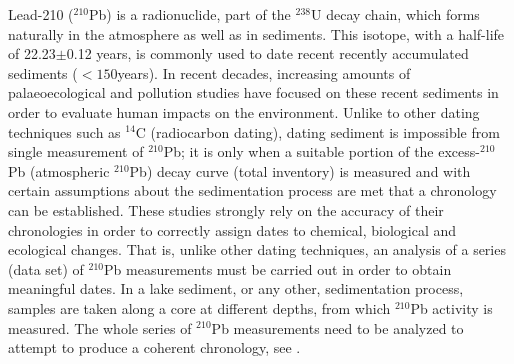 \documentclass [10pt] {article}
\begin{document}
Lead-210 ($^{210}$Pb) is a radionuclide, part of the $^{238}$U decay chain, which forms naturally in the atmosphere as well as in sediments.
This isotope, with a half-life of 22.23$\pm$0.12 years, is commonly used to date recent recently accumulated sediments ($<150$years). 
In recent decades, increasing amounts of palaeoecological and pollution studies have focused on these recent sediments \citep[e.g.,][]{Courtney2019} in order to evaluate human impacts on the environment.
Unlike to other dating techniques such as $^{14}$C (radiocarbon dating), dating sediment is impossible from single measurement of $^{210}$Pb; it is only when a suitable portion of the excess-$^{210}$Pb (atmospheric $^{210}$Pb) decay curve (total inventory) is measured and with certain assumptions about the sedimentation process are met that a chronology can be established.  
These studies strongly rely on the accuracy of their chronologies in order to correctly assign dates to chemical, biological and ecological changes.
That is, unlike other dating techniques, an analysis of a series (data set) of $^{210}$Pb measurements must be carried out in order to obtain meaningful dates.  In a lake sediment, or any other, sedimentation process, samples are taken along a core at different depths, from which $^{210}$Pb activity is measured.  
The whole series of $^{210}$Pb measurements need to be analyzed to attempt to produce a coherent chronology, see \citet{Aquino2018}.
\end{document}
